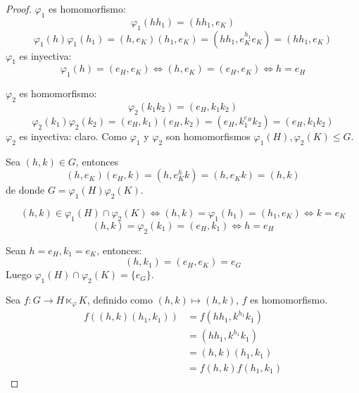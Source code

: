 \begin{proof}
	$\varphi_1$ es homomorfismo:
	\begin{equation*}
		\varphi_1(h h_1) = (h h_1, e_K)
	\end{equation*}
	\begin{equation*}
		\varphi_1(h) \varphi_1(h_1) = (h, e_K)(h_1, e_K) = (h h_1, e_K^{h_1} e_K) = (h h_1, e_K)
	\end{equation*}
	$\varphi_1$ es inyectiva:
	\begin{equation*}
		\varphi_1(h) = (e_H, e_K) \iff (h, e_K) = (e_H, e_K) \iff h = e_H
	\end{equation*}


	$\varphi_2$ es homomorfismo:
	\begin{equation*}
		\varphi_2(k_1 k_2) = (e_H, k_1 k_2)
	\end{equation*}
	\begin{equation*}
		\varphi_2(k_1) \varphi_2(k_2) = (e_H, k_1)(e_H, k_2) = (e_H, k_1^{e_H} k_2) = (e_H, k_1 k_2)
	\end{equation*}
	$\varphi_2$ es inyectiva: claro. Como $\varphi_1$ y $\varphi_2$ son homomorfismos $\varphi_1(H), \varphi_2(K) \le G$.

	Sea $(h, k) \in G$, entonces
	\begin{equation*}
		(h, e_K)(e_H, k) = (h, e_K^h k) = (h, e_K k) = (h, k)
	\end{equation*}
	de donde $G = \varphi_1(H) \varphi_2(K)$.

	\begin{equation*}
		(h, k) \in \varphi_1(H) \cap \varphi_2(K) \iff (h, k) = \varphi_1(h_1) = (h_1, e_K) \iff k=e_K
	\end{equation*}
	\begin{equation*}
		(h, k) = \varphi_2(k_1) = (e_H, k_1) \iff h=e_H
	\end{equation*}

	Sean $h=e_H, k_1=e_K$, entonces:
	\begin{equation*}
		(h, k_1) = (e_H, e_K) = e_G
	\end{equation*}
	Luego $\varphi_1(H) \cap \varphi_2(K) = \{e_G\}$.

	Sea $f: G \to H \ltimes_\varphi K$, definido como $(h, k) \mapsto (h, k)$, $f$ es homomorfismo.
	\begin{align*}
		f((h, k)(h_1, k_1)) & = f(h h_1, k^{h_1} k_1) \\
		                    & = (h h_1, k^{h_1} k_1)  \\
		                    & = (h, k)(h_1, k_1)      \\
		                    & = f(h, k)f(h_1, k_1)
	\end{align*}



\end{proof}
